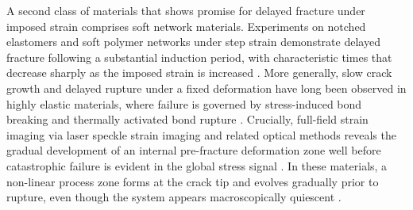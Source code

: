 \documentclass[asymmetricmargins]{library/duthesis}%
\begin{document}
A second class of materials that shows promise for delayed fracture under imposed strain comprises soft network materials. Experiments on notched elastomers and soft polymer networks under step strain demonstrate delayed fracture following a substantial induction period, with characteristic times that decrease sharply as the imposed strain is increased \cite{van_der_kooij_laser_2018,wangDelayedFractureGels2012,Ju2023}. More generally, slow crack growth and delayed rupture under a fixed deformation have long been observed in highly elastic materials, where failure is governed by stress-induced bond breaking \cite{Fan2024,Sanoja2021,Creton2016} and thermally activated bond rupture \cite{Wang2023,Persson2024,Baumberger2009,Hui2004,Creton2016}. Crucially, full-field strain imaging via laser speckle strain imaging and related optical methods reveals the gradual development of an internal pre-fracture deformation zone well before catastrophic failure is evident in the global stress signal \cite{van_der_kooij_laser_2018,Wang2023,ju_role_nodate,Ju2023}. In these materials, a non-linear process zone forms at the crack tip and evolves gradually prior to rupture, even though the system appears macroscopically quiescent \cite{van_der_kooij_laser_2018,Wang2023}.
\end{document}
